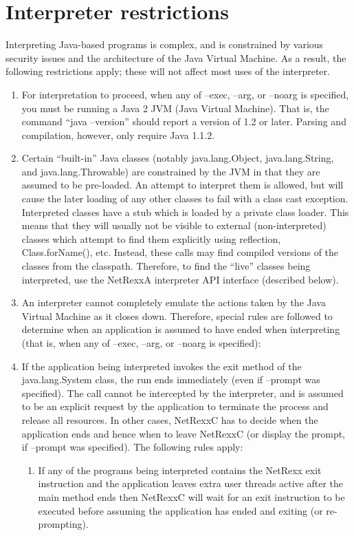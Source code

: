 \section{Interpreter restrictions} 
Interpreting Java-based programs is complex, and is constrained by various security issues and the architecture of the Java Virtual Machine. As a result, the following restrictions apply; these will not affect most uses of the interpreter. 
\begin{enumerate}
\item For interpretation to proceed, when any of –exec, –arg, or –noarg is specified, you must be running a Java 2 JVM (Java Virtual Machine). That is, the command “java –version” should report a version of 1.2 or later. Parsing and compilation, however, only require Java 1.1.2. 
\item Certain “built-in” Java classes (notably java.lang.Object, java.lang.String, and java.lang.Throwable) are constrained by the JVM in that they are assumed to be pre-loaded. An attempt to interpret them is allowed, but will cause the later loading of any other classes to fail with a class cast exception. 
Interpreted classes have a stub which is loaded by a private class loader. This means that they will usually not be visible to external (non-interpreted) classes which attempt to find them explicitly using reflection, Class.forName(), etc. Instead, these calls may find compiled versions of the classes from the classpath. Therefore, to find the “live” classes being interpreted, use the NetRexxA interpreter API interface (described below). 
\item An interpreter cannot completely emulate the actions taken by the Java Virtual Machine as it closes down. Therefore, special rules are followed to determine when an application is assumed to have ended when interpreting (that is, when any of –exec, –arg, or –noarg is specified): 
\item If the application being interpreted invokes the exit method of the java.lang.System class, the run ends immediately (even if –prompt was specified). The call cannot be intercepted by the interpreter, and is assumed to be an explicit request by the application to terminate the process and release all resources. 
In other cases, NetRexxC has to decide when the application ends and hence when to leave NetRexxC (or display the prompt, if –prompt was specified). The following rules apply:
\begin{enumerate} 
\item If any of the programs being interpreted contains the NetRexx exit instruction and the application leaves extra user threads active after the main method ends then NetRexxC will wait for an exit instruction to be executed before assuming the application has ended and exiting (or re-prompting). 

\end{enumerate}
\end{enumerate}
